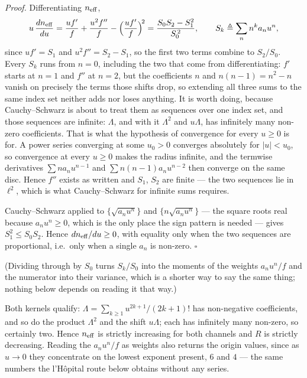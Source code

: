 \documentclass[11pt]{article}
\begin{document}
\emph{Proof.} Differentiating $n_{\rm eff}$,
\[
  u\,\frac{dn_{\rm eff}}{du}
  = \frac{uf'}{f} + \frac{u^2f''}{f}
    - \Bigl(\frac{uf'}{f}\Bigr)^{\!2}
  = \frac{S_0S_2 - S_1^2}{S_0^{\,2}},
  \qquad
  S_k \triangleq \sum_n n^k a_nu^n ,
\]
since $uf' = S_1$ and $u^2f'' = S_2 - S_1$, so the first two terms
combine to $S_2/S_0$. Every $S_k$ runs from $n = 0$, including the two
that come from differentiating: $f'$ starts at $n=1$ and $f''$ at
$n=2$, but the coefficients $n$ and $n(n-1) = n^2 - n$ vanish on
precisely the terms those shifts drop, so extending all three sums to
the same index set neither adds nor loses anything. It is worth doing,
because Cauchy--Schwarz is about to treat them as sequences over one
index set, and those sequences are infinite: $\Lambda$, and with it
$\Lambda^2$ and $u\Lambda$, has infinitely many non-zero coefficients.
That is what the hypothesis of convergence for every $u\ge0$ is for.
A power series converging at some $u_0>0$ converges absolutely for
$|u|<u_0$, so convergence at every $u\ge0$ makes the radius infinite,
and the termwise derivatives $\sum na_nu^{n-1}$ and
$\sum n(n{-}1)a_nu^{n-2}$ then converge on the same disc. Hence $f''$
exists as written and $S_1$, $S_2$ are finite --- the two sequences lie
in $\ell^2$, which is what Cauchy--Schwarz for infinite sums requires.

Cauchy--Schwarz applied to $\bigl\{\sqrt{a_nu^n}\bigr\}$ and
$\bigl\{n\sqrt{a_nu^n}\bigr\}$ --- the square roots real because
$a_nu^n\ge0$, which is the only place the sign pattern is needed ---
gives $S_1^2\le S_0S_2$. Hence
$dn_{\rm eff}/du\ge0$, with equality only when the two sequences are
proportional, i.e.\ only when a single $a_n$ is non-zero. $\square$

(Dividing through by $S_0$ turns $S_k/S_0$ into the moments of the
weights $a_nu^n/f$ and the numerator into their variance, which is a
shorter way to say the same thing; nothing below depends on reading it
that way.)

Both kernels qualify: $\Lambda = \sum_{k\ge1}u^{2k+1}/(2k+1)!$ has
non-negative coefficients, and so do the product $\Lambda^2$ and the
shift $u\Lambda$; each has infinitely many non-zero, so certainly two.
Hence $n_{\rm eff}$ is strictly increasing for both channels and $R$ is
strictly decreasing. Reading the $a_nu^n/f$ as weights also returns the
origin values, since as $u\to0$ they concentrate on the lowest exponent
present, $6$ and $4$ --- the same numbers the l'H\^opital route below
obtains without any series.
\end{document}
